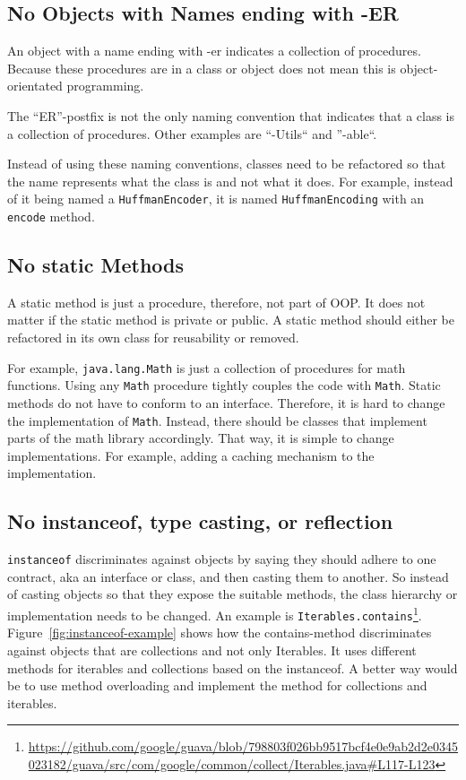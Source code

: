 \subsection{No Objects with Names ending with -ER}\label{subsec:no-objects-with-names-ending-with--er}
An object with a name ending with -er indicates a collection of procedures.
Because these procedures are in a class or object does not mean this is object-orientated programming.

The ``ER''-postfix is not the only naming convention that indicates that a class is a collection of procedures.
Other examples are ``-Utils`` and ''-able``.

Instead of using these naming conventions, classes need to be refactored so that the name represents what the class is and not what it does.
For example, instead of it being named a \texttt{HuffmanEncoder}, it is named \texttt{HuffmanEncoding} with an \texttt{encode} method.\cite{er-postfix,elegant-objects}

\subsection{No static Methods}\label{subsec:no-static-methods}
A static method is just a procedure, therefore, not part of \gls{OOP}.
It does not matter if the static method is private or public.
A static method should either be refactored in its own class for reusability or removed.

For example, \texttt{java.lang.Math} is just a collection of procedures for math functions.
Using any \texttt{Math} procedure tightly couples the code with \texttt{Math}.
Static methods do not have to conform to an interface.
Therefore, it is hard to change the implementation of \texttt{Math}.
Instead, there should be classes that implement parts of the math library accordingly.
That way, it is simple to change implementations.
For example, adding a caching mechanism to the implementation.\cite{elegant-objects}

\subsection{No instanceof, type casting, or reflection}\label{subsec:no-instanceof-type-casting-or-reflection}
\texttt{instanceof} discriminates against objects by saying they should adhere to one contract, aka an interface or class, and then casting them to another.
So instead of casting objects so that they expose the suitable methods, the class hierarchy or implementation needs to be changed.
An example is \texttt{Iterables.contains}\footnote{\url{https://github.com/google/guava/blob/798803f026bb9517bcf4e0e9ab2d2e0345023182/guava/src/com/google/common/collect/Iterables.java\#L117-L123}}.
Figure\ \ref{fig:instanceof-example} shows how the contains-method discriminates against objects that are collections and not only Iterables.
It uses different methods for iterables and collections based on the instanceof.
A better way would be to use method overloading and implement the method for collections and iterables.

